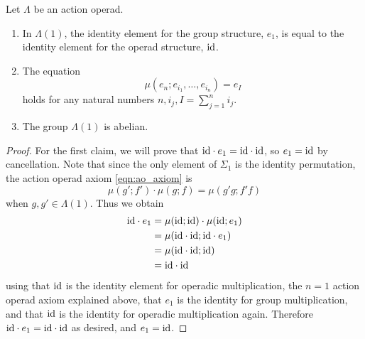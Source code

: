 \begin{lem}\label{lem:calclem}
Let $\Lambda$ be an action operad.
\begin{enumerate}
\item In $\Lambda(1)$, the identity element for the group structure, $e_1$, is equal to the identity element for the operad structure, $\textrm{id}$.
\item The equation
  \[
    \mu(e_{n}; e_{i_{1}}, \ldots, e_{i_{n}}) = e_{I}
  \]
holds for any natural numbers $n, i_{j}, I = \sum_{j=1}^n i_{j}$.
\item The group $\Lambda(1)$ is abelian.
\end{enumerate}
\end{lem}
\begin{proof}
For the first claim, we will prove that $\textrm{id} \cdot e_1 = \textrm{id} \cdot \textrm{id}$, so $e_1 = \textrm{id}$ by cancellation.
Note that since the only element of $\Sigma_1$ is the identity permutation, the action operad axiom \cref{eqn:ao_axiom} is
\[
\mu(g';f')\cdot \mu(g;f) = \mu(g'g; f'f)
\]
when $g, g' \in \Lambda(1)$.
Thus we obtain 
\begin{align*}
\textrm{id} \cdot e_1 & = \mu(\textrm{id}; \textrm{id}) \cdot \mu(\textrm{id}; e_{1}) \\
& = \mu(\textrm{id} \cdot \textrm{id}; \textrm{id} \cdot e_{1}) \\
    &= \mu(\textrm{id} \cdot \textrm{id}; \textrm{id}) \\
    &= \textrm{id} \cdot \textrm{id}
\end{align*}
using that $\textrm{id}$ is the identity element for operadic multiplication, the $n=1$ action operad axiom explained above, that $e_1$ is the identity for group multiplication, and that $\textrm{id}$ is the identity for operadic multiplication again.
Therefore $\textrm{id} \cdot e_1 = \textrm{id} \cdot \textrm{id}$ as desired, and $e_1 = \textrm{id}$.



\end{proof}
